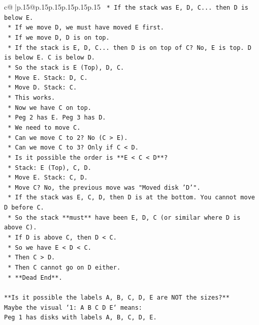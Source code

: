 \documentclass{article}
\begin{document}
{\begin{supertabular}{c@{$\;$}|p{.15\linewidth}@{}p{.15\linewidth}p{.15\linewidth}p{.15\linewidth}p{.15\linewidth}p{.15\linewidth}}
{{{\texttt{    *   If the stack was E, D, C... then D is below E.} \\
\texttt{    *   If we move D, we must have moved E first.} \\
\texttt{    *   If we move D, D is on top.} \\
\texttt{    *   If the stack is E, D, C... then D is on top of C? No, E is top. D is below E. C is below D.} \\
\texttt{    *   So the stack is E (Top), D, C.} \\
\texttt{    *   Move E. Stack: D, C.} \\
\texttt{    *   Move D. Stack: C.} \\
\texttt{    *   This works.} \\
\texttt{    *   Now we have C on top.} \\
\texttt{    *   Peg 2 has E. Peg 3 has D.} \\
\texttt{    *   We need to move C.} \\
\texttt{    *   Can we move C to 2? No (C > E).} \\
\texttt{    *   Can we move C to 3? Only if C < D.} \\
\texttt{    *   Is it possible the order is **E < C < D**?} \\
\texttt{        *   Stack: E (Top), C, D.} \\
\texttt{        *   Move E. Stack: C, D.} \\
\texttt{        *   Move C? No, the previous move was "Moved disk 'D'".} \\
\texttt{        *   If the stack was E, C, D, then D is at the bottom. You cannot move D before C.} \\
\texttt{        *   So the stack **must** have been E, D, C (or similar where D is above C).} \\
\texttt{        *   If D is above C, then D < C.} \\
\texttt{        *   So we have E < D < C.} \\
\texttt{        *   Then C > D.} \\
\texttt{        *   Then C cannot go on D either.} \\
\texttt{        *   **Dead End**.} \\
\\ 
\texttt{**Is it possible the labels A, B, C, D, E are NOT the sizes?**} \\
\texttt{Maybe the visual `1: A B C D E` means:} \\
\texttt{Peg 1 has disks with labels A, B, C, D, E.} \\
}}}
\end{supertabular}}
\end{document}
